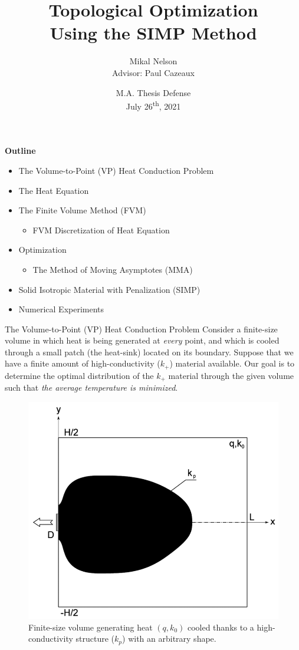 \documentclass[final]{beamer}
\title[SIMP Optimization]{\bf Topological Optimization\\Using the SIMP Method}
\author[Mikal Nelson]{Mikal Nelson\\
Advisor: Paul Cazeaux
}
\institute[KU]{
{University of Kansas}\\
Department of Mathematics\\
mikal.nelson@ku.edu\\
}
\date[M.A. Thesis Defense]{
\small M.A. Thesis Defense\\
July 26\textsuperscript{th}, 2021
}
\begin{document}
\begin{frame}
	\titlepage
\end{frame}

\begin{frame}{\textbf{Outline}}
	\begin{itemize}
		\item The Volume-to-Point (VP) Heat Conduction Problem
		\item The Heat Equation
		\item The Finite Volume Method (FVM)
		\begin{itemize}
			\item FVM Discretization of Heat Equation
		\end{itemize}
		\item Optimization
		\begin{itemize}
			\item The Method of Moving Asymptotes (MMA)
		\end{itemize}
		\item Solid Isotropic Material with Penalization (SIMP)
		\item Numerical Experiments
	\end{itemize}
\end{frame}

\begin{frame}[t]{The Volume-to-Point (VP) Heat Conduction Problem}
	\pause
	Consider a finite-size volume in which heat is being generated at \textit{every} point, and which is cooled through a small patch (the heat-sink) located on its boundary.
	\pause
	\vfill
	Suppose that we have a finite amount of high-conductivity ($k_+$) material available.
	\vfill
	\pause
	Our goal is to determine the optimal distribution of the $k_+$ material through the given volume such that \textit{the average temperature is minimized}.\vfill
\end{frame}

\begin{frame}
	\begin{figure}
		\centering
		\includegraphics[height=0.65\textwidth]{VP-Problem.png}
		\caption[VP Problem Diagram]{Finite-size volume generating heat $(q, k_0)$ cooled thanks to a high-conductivity structure ($k_p$) with an arbitrary shape. \cite{Marck2012}}
	\end{figure}
\end{frame}
\end{document}
